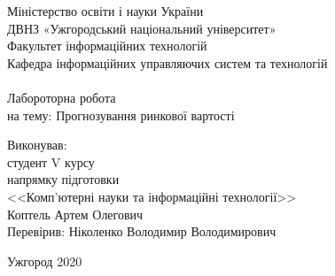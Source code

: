 \begin{center}

    \large Міністерство освіти і науки України\\
    ДВНЗ «Ужгородський національний університет»\\
    Факультет інформаційних технологій\\
    Кафедра інформаційних управляючих систем та технологій\\
    \\[5.5cm]

    \huge Лабороторна робота \\[0.6cm] %
    \large на тему:  {Прогнозування \linebreak ринкової вартості}\\[3.7cm]


\end{center}

\begin{flushright}
    Виконував:\\
    студент V курсу\\
    напрямку підготовки\\
    <<Комп’ютерні науки та інформаційні технології>> \\
    Коптель Артем Олегович \\
    Перевірив: Ніколенко Володимир Володимирович
\end{flushright}


\vfill

\begin{center}
    \large Ужгород 2020
\end{center}

\thispagestyle{empty}
